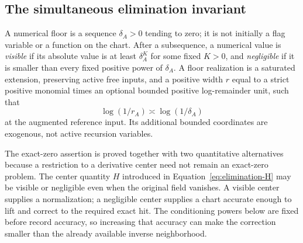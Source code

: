 \subsection{The simultaneous elimination invariant}

A numerical floor is a sequence $\delta_A>0$ tending to zero; it is
not initially a flag variable or a function on the chart.  After a
subsequence, a numerical value is \emph{visible} if its absolute value
is at least $\delta_A^K$ for some fixed $K>0$, and \emph{negligible}
if it is smaller than every fixed positive power of $\delta_A$.
A floor realization is a saturated extension, preserving active free
inputs, and a positive width $r$ equal to a strict positive monomial
times an optional bounded positive log-remainder unit, such that
\begin{equation}\label{eq:elimination-floor}
 \log(1/r_A)\asymp\log(1/\delta_A)
\end{equation}
at the augmented reference input.  Its additional bounded coordinates
are exogenous, not active recursion variables.

The exact-zero assertion is proved together with two quantitative
alternatives because a restriction to a derivative center need not
remain an exact-zero problem.  The center quantity $H$ introduced in
Equation~\eqref{eq:elimination-H} may be visible or negligible even
when the original field vanishes.  A visible center supplies a
normalization; a negligible center supplies a chart accurate enough
to lift and correct to the required exact hit.  The conditioning
powers below are fixed before record accuracy, so increasing that
accuracy can make the correction smaller than the already available
inverse neighborhood.

